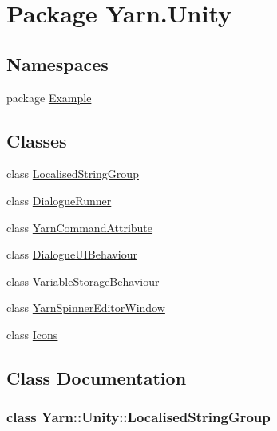 \hypertarget{a00109}{\section{Package Yarn.\-Unity}
\label{a00109}
}
\subsection*{Namespaces}
\begin{DoxyCompactItemize}
\item 
package \hyperlink{a00312}{Example}
\end{DoxyCompactItemize}
\subsection*{Classes}
\begin{DoxyCompactItemize}
\item 
class \hyperlink{a00109_de/dab/a00319}{Localised\-String\-Group}
\item 
class \hyperlink{a00073}{Dialogue\-Runner}
\item 
class \hyperlink{a00169}{Yarn\-Command\-Attribute}
\item 
class \hyperlink{a00075}{Dialogue\-U\-I\-Behaviour}
\item 
class \hyperlink{a00167}{Variable\-Storage\-Behaviour}
\item 
class \hyperlink{a00162}{Yarn\-Spinner\-Editor\-Window}
\item 
class \hyperlink{a00087}{Icons}
\end{DoxyCompactItemize}


\subsection{Class Documentation}
\label{de/dab/a00319}
\hypertarget{a00109_de/dab/a00319}{}
\subsubsection{class Yarn\-:\-:Unity\-:\-:Localised\-String\-Group}


